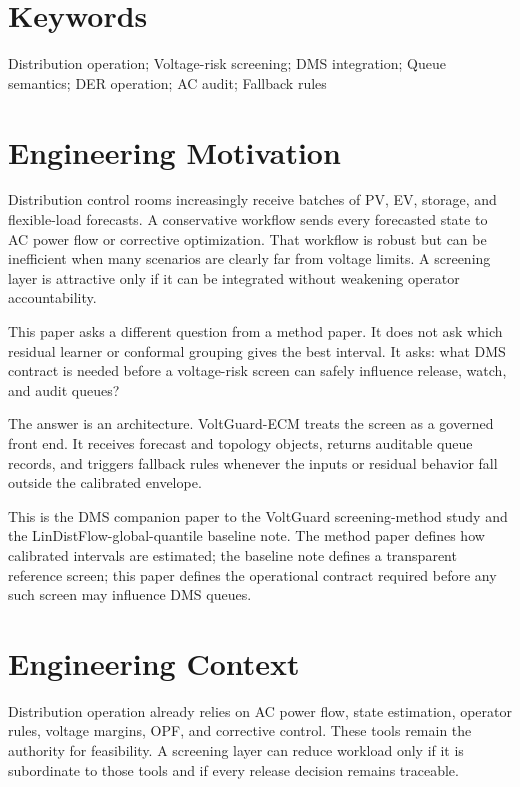 \documentclass[
  preprint,12pt]{elsarticle}
\begin{document}
\section*{Keywords}\label{keywords}

Distribution operation; Voltage-risk screening; DMS integration; Queue
semantics; DER operation; AC audit; Fallback rules

\section{Engineering Motivation}\label{engineering-motivation}

Distribution control rooms increasingly receive batches of PV, EV,
storage, and flexible-load forecasts. A conservative workflow sends
every forecasted state to AC power flow or corrective optimization. That
workflow is robust but can be inefficient when many scenarios are
clearly far from voltage limits. A screening layer is attractive only if
it can be integrated without weakening operator accountability.

This paper asks a different question from a method paper. It does not
ask which residual learner or conformal grouping gives the best
interval. It asks: what DMS contract is needed before a voltage-risk
screen can safely influence release, watch, and audit queues?

The answer is an architecture. VoltGuard-ECM treats the screen as a
governed front end. It receives forecast and topology objects, returns
auditable queue records, and triggers fallback rules whenever the inputs
or residual behavior fall outside the calibrated envelope.

This is the DMS companion paper to the VoltGuard screening-method study
and the LinDistFlow-global-quantile baseline note. The method paper
defines how calibrated intervals are estimated; the baseline note
defines a transparent reference screen; this paper defines the
operational contract required before any such screen may influence DMS
queues.

\section{Engineering Context}\label{engineering-context}

Distribution operation already relies on AC power flow, state
estimation, operator rules, voltage margins, OPF, and corrective
control. These tools remain the authority for feasibility. A screening
layer can reduce workload only if it is subordinate to those tools and
if every release decision remains traceable.
\end{document}
